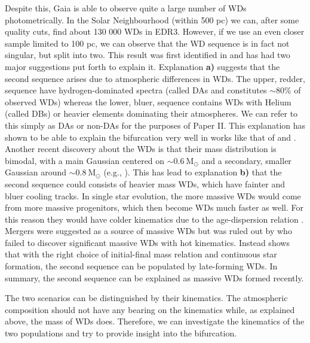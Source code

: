 Despite this, Gaia is able to observe quite a large number of WDs photometrically. In the Solar Neighbourhood (within 500 pc) we can, after some quality cuts, find about 130 000 WDs in EDR3. However, if we use an even closer sample limited to 100 pc, we can observe that the WD sequence is in fact not singular, but split into two. This result was first identified in \cite{dr2:hr} and has had two major suggestions put forth to explain it. Explanation \textbf{a)} suggests that the second sequence arises due to atmospheric differences in WDs. The upper, redder, sequence have hydrogen-dominated spectra (called DAs and constitutes {$\sim$}80\% of observed WDs) whereas the lower, bluer, sequence contains WDs with Helium (called DBs) or heavier elements dominating their atmospheres. We can refer to this simply as DAs or non-DAs for the purposes of Paper II. This explanation has shown to be able to explain the bifurcation very well in works like that of \cite{kilic:18, kilic:20} and \cite{gentile-fusilo:19}. Another recent discovery about the WDs is that their mass distribution is bimodal, with a main Gaussian centered on ${\sim}0.6\ \mathrm{M}_\odot$ and a secondary, smaller Gaussian around ${\sim}0.8\ \mathrm{M}_\odot$ (e.g., \citealt{elbadry:18, kilic:18, kilic:20}). This has lead to explanation \textbf{b)} that the second sequence could consists of heavier mass WDs, which have fainter and bluer cooling tracks. In single star evolution, the more massive WDs would come from more massive progenitors, which then become WDs much faster as well. For this reason they would have colder kinematics due to the age-dispersion relation \citep{aumer:16}. Mergers were suggested as a source of massive WDs but was ruled out by \cite{kilic:20} who failed to discover significant massive WDs with hot kinematics. Instead \cite{elbadry:18} shows that with the right choice of initial-final mass relation and continuous star formation, the second sequence can be populated by late-forming WDs. In summary, the second sequence can be explained as massive WDs formed recently. 

The two scenarios can be distinguished by their kinematics. The atmospheric composition should not have any bearing on the kinematics while, as explained above, the mass of WDs does. Therefore, we can investigate the kinematics of the two populations and try to provide insight into the bifurcation. 

